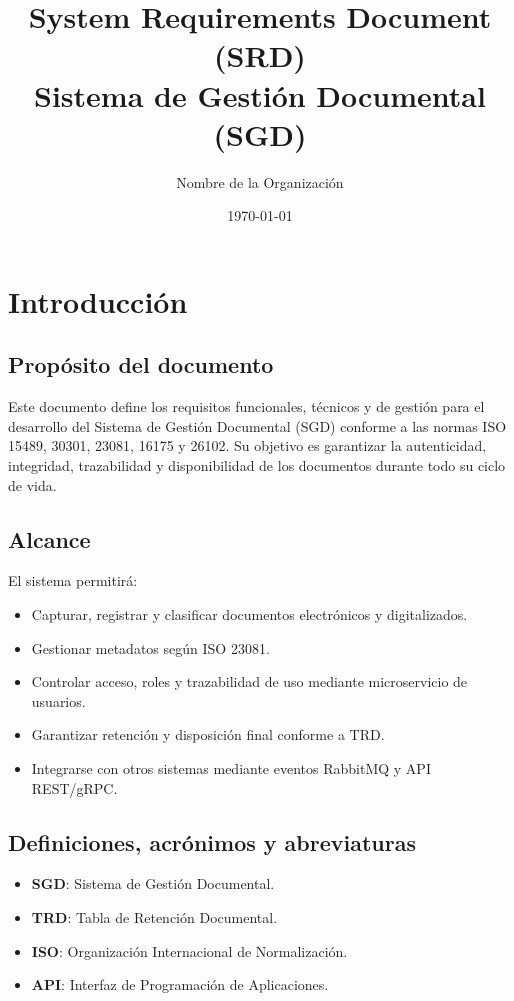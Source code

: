 \documentclass[12pt,a4paper]{article}
\title{System Requirements Document (SRD) \\ Sistema de Gestión Documental (SGD)}
\author{Nombre de la Organización}
\date{\today}
\begin{document}
\maketitle
\tableofcontents
\newpage

\section{Introducción}

\subsection{Propósito del documento}
Este documento define los requisitos funcionales, técnicos y de gestión para el desarrollo del Sistema de Gestión Documental (SGD) conforme a las normas ISO 15489, 30301, 23081, 16175 y 26102. Su objetivo es garantizar la autenticidad, integridad, trazabilidad y disponibilidad de los documentos durante todo su ciclo de vida.

\subsection{Alcance}
El sistema permitirá:
\begin{itemize}
    \item Capturar, registrar y clasificar documentos electrónicos y digitalizados.
    \item Gestionar metadatos según ISO 23081.
    \item Controlar acceso, roles y trazabilidad de uso mediante microservicio de usuarios.
    \item Garantizar retención y disposición final conforme a TRD.
    \item Integrarse con otros sistemas mediante eventos RabbitMQ y API REST/gRPC.
\end{itemize}

\subsection{Definiciones, acrónimos y abreviaturas}
\begin{itemize}
    \item \textbf{SGD}: Sistema de Gestión Documental.
    \item \textbf{TRD}: Tabla de Retención Documental.
    \item \textbf{ISO}: Organización Internacional de Normalización.
    \item \textbf{API}: Interfaz de Programación de Aplicaciones.
\end{itemize}
\end{document}

